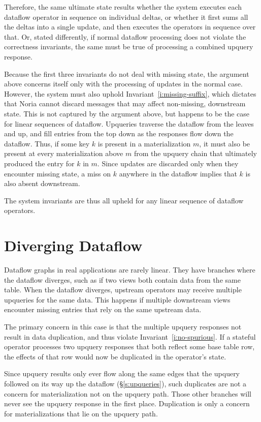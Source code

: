 Therefore, the same ultimate state results whether the system executes each
dataflow operator in sequence on individual deltas, or whether it first sums all
the deltas into a single update, and then executes the operators in sequence
over that. Or, stated differently, if normal dataflow processing does not
violate the correctness invariants, the same must be true of processing a
combined upquery response.

Because the first three invariants do not deal with missing state, the argument
above concerns itself only with the processing of updates in the normal case.
However, the system must also uphold Invariant~\ref{i:missing-suffix}, which
dictates that Noria cannot discard messages that may affect non-missing,
downstream state. This is not captured by the argument above, but happens to be
the case for linear sequences of dataflow. Upqueries traverse the dataflow from
the leaves and up, and fill entries from the top down as the responses flow down
the dataflow. Thus, if some key $k$ is present in a materialization $m$, it must
also be present at every materialization above $m$ from the upquery chain that
ultimately produced the entry for $k$ in $m$. Since updates are discarded only
when they encounter missing state, a miss on $k$ anywhere in the dataflow
implies that $k$ is also absent downstream.

The system invariants are thus all upheld for any linear sequence of dataflow
operators.

\section{Diverging Dataflow}
\label{s:partial:diverging}

Dataflow graphs in real applications are rarely linear. They have branches where
the dataflow diverges, such as if two views both contain data from the same
table. When the dataflow diverges, upstream operators may receive multiple
upqueries for the same data. This happens if multiple downstream views encounter
missing entries that rely on the same upstream data.

The primary concern in this case is that the multiple upquery responses not
result in data duplication, and thus violate Invariant~\ref{i:no-spurious}. If a
stateful operator processes two upquery responses that both reflect some base
table row, the effects of that row would now be duplicated in the operator's
state.

Since upquery results only ever flow along the same edges that the upquery
followed on its way up the dataflow (\S\ref{s:upqueries}), such duplicates are
not a concern for materialization not on the upquery path. Those other branches
will never see the upquery response in the first place. Duplication is only a
concern for materializations that lie on the upquery path.

